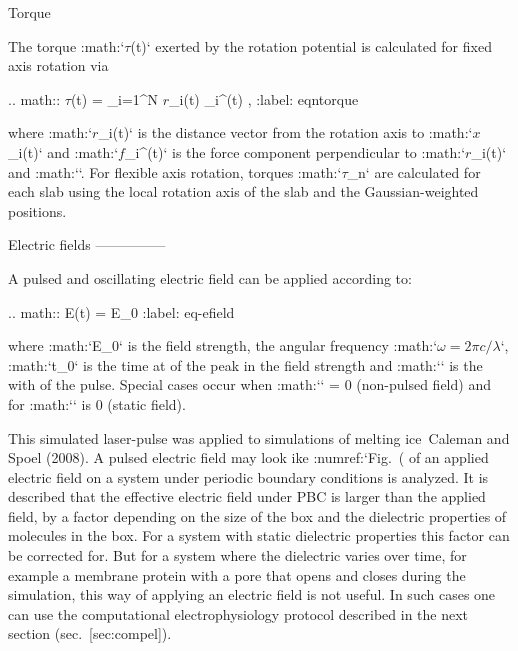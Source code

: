 Torque
^^^^^^

The torque :math:`{\mbox{\boldmath ${\tau}$}}(t)` exerted by the
rotation potential is calculated for fixed axis rotation via

.. math:: {\mbox{\boldmath ${\tau}$}}(t) = \sum_{i=1}^{N} {\mbox{\boldmath ${r}$}}_i(t) _{\!i}^\perp(t) ,
          :label: eqntorque

where :math:`{\mbox{\boldmath ${r}$}}_i(t)` is the distance vector from
the rotation axis to :math:`{\mbox{\boldmath ${x}$}}_i(t)` and
:math:`{\mbox{\boldmath ${f}$}}_{\!i}^\perp(t)` is the force component
perpendicular to :math:`{\mbox{\boldmath ${r}$}}_i(t)` and
:math:``. For flexible axis rotation,
torques :math:`{\mbox{\boldmath ${\tau}$}}_{\!n}` are calculated for
each slab using the local rotation axis of the slab and the
Gaussian-weighted positions.

Electric fields
---------------

A pulsed and oscillating electric field can be applied according to:

.. math:: E(t) = E_0 \exp{}\cos{}
          :label: eq-efield

where :math:`E_0` is the field strength, the angular frequency
:math:`{\mbox{$\omega = 2\pi c/\lambda$}}`, :math:`t_0` is the time
at of the peak in the field strength and :math:`\sigma` is the with of
the pulse. Special cases occur when :math:`\sigma` = 0 (non-pulsed
field) and for :math:`\omega` is 0 (static field).

This simulated laser-pulse was applied to simulations of melting
ice Caleman and Spoel (2008). A pulsed electric field may look ike
:numref:`Fig. (%
of an applied electric field on a system under periodic boundary
conditions is analyzed. It is described that the effective electric
field under PBC is larger than the applied field, by a factor depending
on the size of the box and the dielectric properties of molecules in the
box. For a system with static dielectric properties this factor can be
corrected for. But for a system where the dielectric varies over time,
for example a membrane protein with a pore that opens and closes during
the simulation, this way of applying an electric field is not useful.
In such cases one can use the computational electrophysiology protocol
described in the next section (sec. [sec:compel]).

